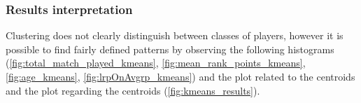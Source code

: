 \documentclass{article}
\begin{document}
\subsubsection{Results interpretation}
Clustering does not clearly distinguish between classes of players, however it is possible to find fairly defined patterns by observing the following histograms (\ref{fig:total_match_played_kmeans}, \ref{fig:mean_rank_points_kmeans}, \ref{fig:age_kmeans}, \ref{fig:lrpOnAvgrp_kmeans}) and the plot related to the centroids  and the plot regarding the centroids (\ref{fig:kmeans_results}).


\end{document}
